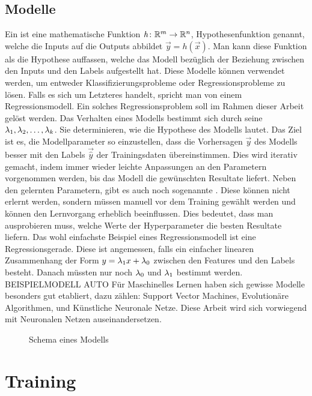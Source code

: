 \subsection{Modelle}
Ein  ist eine mathematische Funktion $\mathit{h}\colon \mathbb{R}^m
\to \mathbb{R}^n$, Hypothesenfunktion genannt, welche die Inputs auf die Outputs abbildet $\vec{y}=\mathit{h}(\vec{x})$.
Man kann diese Funktion als die Hypothese auffassen, welche das Modell bezüglich der Beziehung zwischen
den Inputs und den Labels aufgestellt hat.
Diese Modelle können verwendet werden, um entweder
Klassifizierungsprobleme oder Regressionsprobleme zu lösen. Falls es sich um
Letzteres handelt, spricht man von einem Regressionsmodell. Ein solches
Regressionsproblem soll im Rahmen dieser Arbeit gelöst werden.
\para{}
Das Verhalten eines Modells bestimmt sich durch seine 
$\lambda_1, \lambda_2,\ldots,\lambda_k$. Sie determinieren, wie die Hypothese des Modells lautet.
Das Ziel ist es, die Modellparameter so einzustellen, dass die Vorhersagen
$\vec{y}$ des Modells besser mit den Labels $\vec{\hat{y}}$ der Trainingsdaten übereinstimmen.
Dies wird iterativ gemacht, indem immer wieder leichte Anpassungen an den
Parametern vorgenommen werden, bis das Modell die gewünschten Resultate liefert.
\para{}
Neben den gelernten Parametern, gibt es auch noch sogenannte .
Diese können nicht erlernt werden, sondern müssen manuell vor dem Training gewählt werden und können den Lernvorgang erheblich beeinflussen.
Dies bedeutet, dass man ausprobieren muss, welche Werte der Hyperparameter
die besten Resultate liefern.
\para{}
Das wohl einfachste Beispiel eines Regressionsmodell ist eine Regressionsgerade. Diese ist
angemessen, falls ein einfacher linearen Zusammenhang der Form $y=\lambda_1x +
\lambda_0$ zwischen den Features und den Labels besteht.
Danach müssten nur noch $\lambda_0$ und $\lambda_1$ bestimmt werden.
BEISPIELMODELL AUTO
\para{}
Für Maschinelles Lernen haben sich gewisse Modelle besonders gut etabliert,
dazu zählen: Support Vector Machines, Evolutionäre Algorithmen, und Künstliche Neuronale Netze.
Diese Arbeit wird sich vorwiegend mit Neuronalen Netzen auseinandersetzen.
\\
\begin{figure}[h!]
  \centering


  \caption{Schema eines Modells}
\end{figure}

\section{Training}
